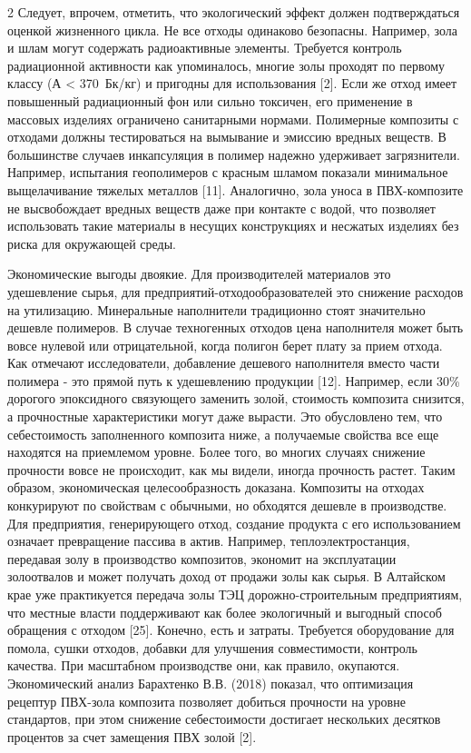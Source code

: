 \begin{multicols}{2}
Следует, впрочем, отметить, что экологический эффект должен
подтверждаться оценкой жизненного цикла. Не все отходы одинаково
безопасны. Например, зола и шлам могут содержать радиоактивные элементы.
Требуется контроль радиационной активности как упоминалось, многие золы
проходят по первому классу (А <{} 370~Бк/кг)
и пригодны для использования {[}2{]}. Если же отход имеет повышенный
радиационный фон или сильно токсичен, его применение в массовых изделиях
ограничено санитарными нормами. Полимерные композиты с отходами должны
тестироваться на вымывание и эмиссию вредных веществ. В большинстве
случаев инкапсуляция в полимер надежно удерживает загрязнители.
Например, испытания геополимеров с красным шламом показали минимальное
выщелачивание тяжелых металлов {[}11{]}. Аналогично, зола уноса в
ПВХ-композите не высвобождает вредных веществ даже при контакте с водой,
что позволяет использовать такие материалы в несущих конструкциях и
несжатых изделиях без риска для окружающей среды.

Экономические выгоды двоякие. Для производителей материалов это
удешевление сырья, для предприятий-отходообразователей это снижение
расходов на утилизацию. Минеральные наполнители традиционно стоят
значительно дешевле полимеров. В случае техногенных отходов цена
наполнителя может быть вовсе нулевой или отрицательной, когда полигон
берет плату за прием отхода. Как отмечают исследователи, добавление
дешевого наполнителя вместо части полимера - это прямой путь к
удешевлению продукции {[}12{]}. Например, если 30\% дорогого эпоксидного
связующего заменить золой, стоимость композита снизится, а прочностные
характеристики могут даже вырасти. Это обусловлено тем, что
себестоимость заполненного композита ниже, а получаемые свойства все еще
находятся на приемлемом уровне. Более того, во многих случаях снижение
прочности вовсе не происходит, как мы видели, иногда прочность растет.
Таким образом, экономическая целесообразность доказана. Композиты на
отходах конкурируют по свойствам с обычными, но обходятся дешевле в
производстве. Для предприятия, генерирующего отход, создание продукта с
его использованием означает превращение пассива в актив. Например,
теплоэлектростанция, передавая золу в производство композитов, экономит
на эксплуатации золоотвалов и может получать доход от продажи золы как
сырья. В Алтайском крае уже практикуется передача золы ТЭЦ
дорожно-строительным предприятиям, что местные власти поддерживают как
более экологичный и выгодный способ обращения с отходом {[}25{]}.
Конечно, есть и затраты. Требуется оборудование для помола, сушки
отходов, добавки для улучшения совместимости, контроль качества. При
масштабном производстве они, как правило, окупаются. Экономический
анализ Барахтенко В.В. (2018) показал, что оптимизация рецептур ПВХ-зола
композита позволяет добиться прочности на уровне стандартов, при этом
снижение себестоимости достигает нескольких десятков процентов за счет
замещения ПВХ золой {[}2{]}.


\end{multicols}
